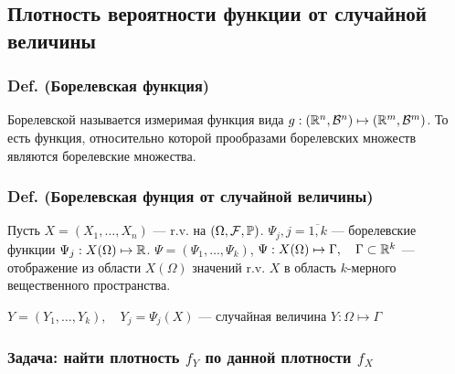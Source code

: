 \subsection{Плотность вероятности функции от случайной
величины}\label{ux43fux43bux43eux442ux43dux43eux441ux442ux44c-ux432ux435ux440ux43eux44fux442ux43dux43eux441ux442ux438-ux444ux443ux43dux43aux446ux438ux438-ux43eux442-ux441ux43bux443ux447ux430ux439ux43dux43eux439-ux432ux435ux43bux438ux447ux438ux43dux44b}

\subsubsection{Def. (Борелевская
функция)}\label{def.-ux431ux43eux440ux435ux43bux435ux432ux441ux43aux430ux44f-ux444ux443ux43dux43aux446ux438ux44f}

Борелевской называется измеримая функция вида
\(g : (\mathbb R^n, \mathcal B^n)\mapsto (\mathbb R^m,\mathcal B^m)\). То есть функция,
относительно которой прообразами борелевских множеств являются
борелевские множества.

\subsubsection{Def. (Борелевская фунция от случайной
величины)}\label{def.-ux431ux43eux440ux435ux43bux435ux432ux441ux43aux430ux44f-ux444ux443ux43dux446ux438ux44f-ux43eux442-ux441ux43bux443ux447ux430ux439ux43dux43eux439-ux432ux435ux43bux438ux447ux438ux43dux44b}

Пусть \(X = (X_1, \ldots, X_n)\) --- r.v. на \((\Omega, \mathcal F, \mathbb P)\).
\({\Psi_j, j=\overline{1,k}}\) --- борелевские функции
\({\Psi_j : X(\Omega)\mapsto\mathbb R}\).
\({\Psi = (\Psi_1, \ldots, \Psi_k)}\),
\({\Psi : X(\Omega)\mapsto\Gamma, \quad \Gamma\subset\mathbb R^k}\) ---
отображение из области \(X(\Omega)\) значений r.v. \(X\) в область
\(k\)-мерного вещественного пространства.

\(Y = (Y_1, \ldots, Y_k), \quad Y_j = \Psi_j(X)\) --- случайная величина
\(Y: \Omega\mapsto\Gamma\)

\subsubsection{\texorpdfstring{Задача: найти плотность \(f_Y\) по данной
плотности
\(f_X\)}{Задача: найти плотность f\_Y по данной плотности f\_X}}\label{ux437ux430ux434ux430ux447ux430-ux43dux430ux439ux442ux438-ux43fux43bux43eux442ux43dux43eux441ux442ux44c-fux5fy-ux43fux43e-ux434ux430ux43dux43dux43eux439-ux43fux43bux43eux442ux43dux43eux441ux442ux438-fux5fx}


